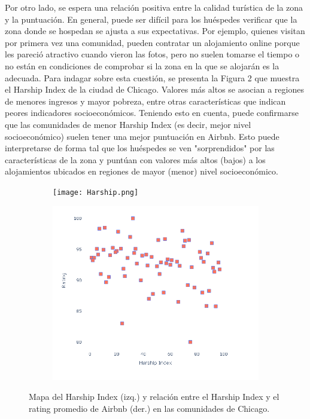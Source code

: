\documentclass[10.5pt]{article}   %
\begin{document}
Por otro lado, se espera una relación positiva entre la calidad turística de la zona y la puntuación. En general, puede ser difícil para los huéspedes verificar que la zona donde se hospedan se ajusta a sus expectativas. Por ejemplo, quienes visitan por primera vez una comunidad, pueden contratar un alojamiento online porque les pareció atractivo cuando vieron las fotos, pero no suelen tomarse el tiempo o no están en condiciones de comprobar si la zona en la que se alojarán es la adecuada. Para indagar sobre esta cuestión, se presenta la Figura 2 que muestra el Harship Index de la ciudad de Chicago. Valores más altos se asocian a regiones de menores ingresos y mayor pobreza, entre otras características que indican peores indicadores socioeconómicos. Teniendo esto en cuenta, puede confirmarse que las comunidades de menor Harship Index (es decir, mejor nivel socioeconómico) suelen tener una mejor puntuación en Airbnb. Esto puede interpretarse de forma tal que los huéspedes se ven "sorprendidos" por las características de la zona y puntúan con valores más altos (bajos) a los alojamientos ubicados en regiones de mayor (menor) nivel socioeconómico. 


\begin{figure}[H]
\centering
\begin{subfigure}{.5\textwidth}
    \centering
     \textbf{}\par\medskip
    \texttt{[image: Harship.png]}
    \label{fig2}
\end{subfigure}%
\begin{subfigure}{0.65\textwidth}
    \centering
     \textbf{}\par\medskip
    \includegraphics[scale=0.6]{Harship_Index.png}
    \label{fig2}
\end{subfigure}%
\caption{Mapa del Harship Index (izq.) y relación entre el Harship Index y el rating promedio de Airbnb (der.) en las comunidades de Chicago.}
\end{figure}
\end{document}
